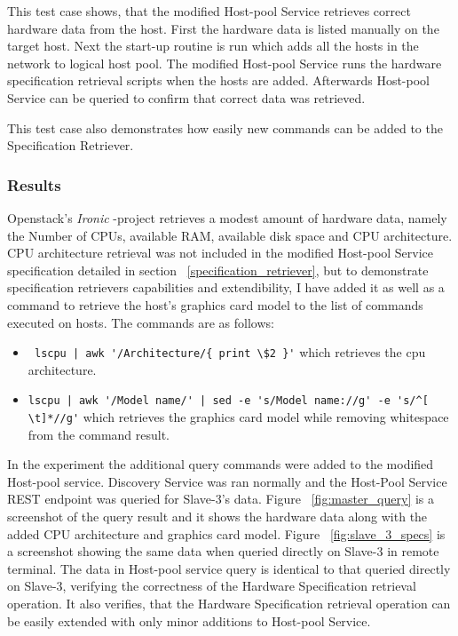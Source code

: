 This test case shows, that the modified Host-pool Service retrieves correct hardware data from the host. First the hardware data is listed manually on the target host. Next the start-up routine is run which adds all the hosts in the network to logical host pool. The modified Host-pool Service runs the hardware specification retrieval scripts when the hosts are added. Afterwards Host-pool Service can be queried to confirm that correct data was retrieved.

This test case also demonstrates how easily new commands can be added to the Specification Retriever.

\subsubsection*{Results}

Openstack's \textit{Ironic} -project\cite{ironic_troubleshoot} retrieves a modest amount of hardware data, namely the Number of CPUs, available RAM, available disk space and CPU architecture. CPU architecture retrieval was not included in the modified Host-pool Service specification detailed in section ~\ref{specification_retriever}, but to demonstrate specification retrievers capabilities and extendibility, I have added it as well as a command to retrieve the host's graphics card model to the list of commands executed on hosts. The commands are as follows:

\begin{itemize}
\item \verb= lscpu | awk '/Architecture/{ print \$2 }'= which retrieves the cpu architecture.
\item \verb=lscpu | awk '/Model name/' | sed -e 's/Model name://g' -e 's/^[ \t]*//g'= which retrieves the graphics card model while removing whitespace from the command result.
\end{itemize}

In the experiment the additional query commands were added to the modified Host-pool service. Discovery Service was ran normally and the Host-Pool Service REST endpoint was queried for Slave-3's data. Figure ~\ref{fig:master_query} is a screenshot of the query result and it shows the hardware data along with the added CPU architecture and graphics card model. Figure ~\ref{fig:slave_3_specs} is a screenshot showing the same data when queried directly on Slave-3 in remote terminal. The data in Host-pool service query is identical to that queried directly on Slave-3, verifying the correctness of the Hardware Specification retrieval operation. It also verifies, that the Hardware Specification retrieval operation can be easily extended with only minor additions to Host-pool Service.

